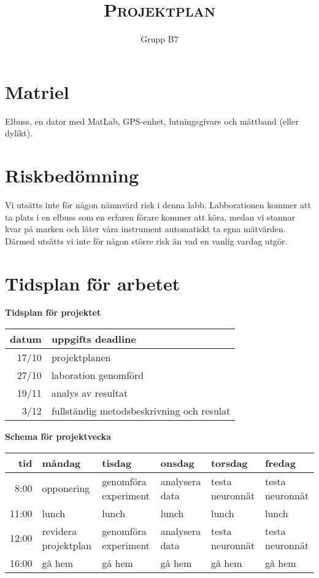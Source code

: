 \documentclass[]{article}
\title{{\huge \textsc{Projektplan}}}
\author{Grupp B7}
\begin{document}
\maketitle
{}
\tableofcontents
\cleardoublepage
{}



\section{Matriel}
Elbuss, en dator med MatLab, GPS-enhet, lutningsgivare och
måttband (eller dylikt).



\section{Riskbedömning}
Vi utsätts inte för någon nämnvärd risk i denna labb.
Labborationen kommer att ta plats i en elbuss som en erfaren förare kommer att köra,
medan vi stannar kvar på marken och låter våra instrument automatiskt ta egna mätvärden.
Därmed utsätts vi inte för någon större risk än vad en vanlig vardag utgör.

\section{Tidsplan för arbetet}
\begin{center}
	{\textbf{Tidsplan för projektet}} \par
	\begin{tabular}{r | l}
		datum & uppgifts deadline \\ \hline
		17/10 & projektplanen \\
		27/10 & laboration genomförd \\
		19/11 & analys av resultat \\
		3/12 & fullständig metodsbeskrivning och resulat \\
		\hline
	\end{tabular}

	\vspace{0.75cm}

	{\textbf{Schema för projektvecka}} \par
	\begin{tabular}{r | l l l l l}
		tid & måndag & tisdag & onsdag & torsdag & fredag \\ \hline
		8:00 & opponering & genomföra experiment & analysera data & testa
			neuronnät & testa neuronnät \\
		11:00 & lunch & lunch & lunch & lunch & lunch \\
		12:00 & revidera projektplan & genomföra experiment & analysera data &
			testa neuronnät & testa neuronnät \\
		16:00 & gå hem & gå hem & gå hem & gå hem & gå hem \\
		\hline
	\end{tabular}
\end{center}

\clearpage
\printbibliography
\end{document}
